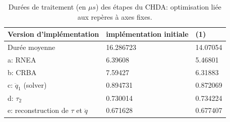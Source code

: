 \documentclass{report}
\begin{document}
\begin{flushleft}
\begin{table}[H]
\begin{center}
\begin{tabular}[H]{|l|l|l|}
\hline
Version d'implémentation                   & implémentation initiale    & (1)      \\ \hline \hline
Durée moyenne                              & 16.286723                  & 14.07054 \\
a: RNEA                                    & 6.39608                    & 5.46801  \\
b: CRBA                                    & 7.59427                    & 6.31883  \\
c: $\ddot{q}_1$ (solver)                   & 0.894731                   & 0.872069 \\
d: $\tau_2$                                & 0.730014                   & 0.734224 \\
e: reconstruction de $\tau$ et $\ddot{q}$  & 0.671628                   & 0.677407 \\
\hline
\end{tabular}
\caption[Table caption text]{Durées de traitement (en $\mu s$) des étapes du CHDA: optimisation liée aux repères à axes fixes.}
\label{table:performancesOptimAxesFixes}
\end{center}
\end{table}


\end{flushleft}
\end{document}
